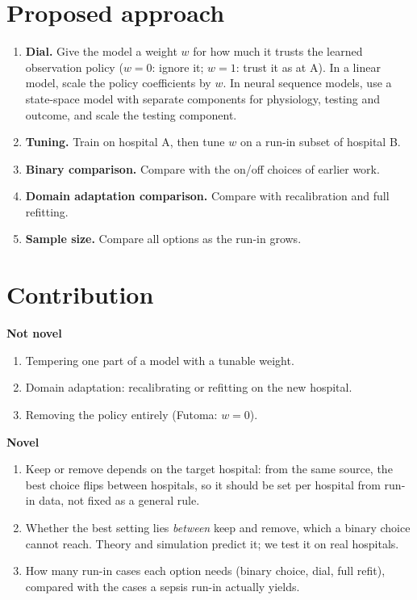 \documentclass[11pt,a4paper]{article}
\begin{document}
\section{Proposed approach}

\begin{enumerate}[label=(\alph*)]
  \item \textbf{Dial.} Give the model a weight $w$ for how much it trusts the learned observation policy ($w=0$: ignore it; $w=1$: trust it as at A). In a linear model, scale the policy coefficients by $w$. In neural sequence models, use a state-space model with separate components for physiology, testing and outcome, and scale the testing component.
  \item \textbf{Tuning.} Train on hospital A, then tune $w$ on a run-in subset of hospital B.
  \item \textbf{Binary comparison.} Compare with the on/off choices of earlier work.
  \item \textbf{Domain adaptation comparison.} Compare with recalibration and full refitting.
  \item \textbf{Sample size.} Compare all options as the run-in grows.
\end{enumerate}

\section{Contribution}

\begin{minipage}[t]{0.46\linewidth}
\textbf{Not novel}
\begin{enumerate}
  \item Tempering one part of a model with a tunable weight.
  \item Domain adaptation: recalibrating or refitting on the new hospital.
  \item Removing the policy entirely (Futoma: $w=0$).
\end{enumerate}
\end{minipage}\hfill
\begin{minipage}[t]{0.5\linewidth}
\textbf{Novel}
\begin{enumerate}
  \item Keep or remove depends on the target hospital: from the same source, the best choice flips between hospitals, so it should be set per hospital from run-in data, not fixed as a general rule.
  \item Whether the best setting lies \emph{between} keep and remove, which a binary choice cannot reach. Theory and simulation predict it; we test it on real hospitals.
  \item How many run-in cases each option needs (binary choice, dial, full refit), compared with the cases a sepsis run-in actually yields.
\end{enumerate}
\end{minipage}
\end{document}
